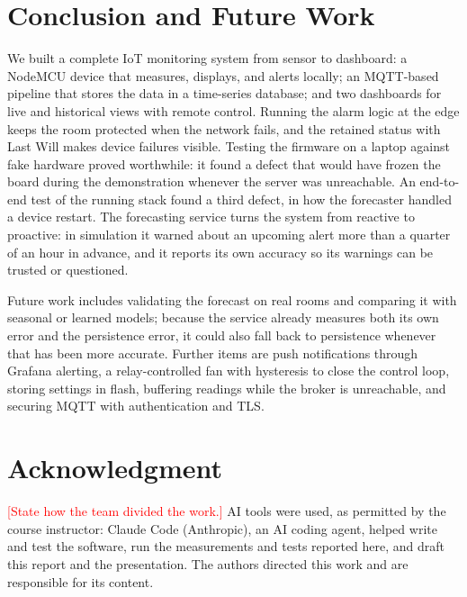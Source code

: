 \documentclass[conference]{IEEEtran}
\newcommand{\fillin}[1]{\textcolor{red}{[#1]}}
\begin{document}
\section{Conclusion and Future Work}

We built a complete IoT monitoring system from sensor to dashboard: a NodeMCU device
that measures, displays, and alerts locally; an MQTT-based pipeline that stores the
data in a time-series database; and two dashboards for live and historical views with
remote control. Running the alarm logic at the edge keeps the room protected when the
network fails, and the retained status with Last Will makes device failures visible.
Testing the firmware on a laptop against fake hardware proved worthwhile: it found
a defect that would have frozen the board during the demonstration whenever the server
was unreachable. An end-to-end test of the running stack found a third defect, in how
the forecaster handled a device restart. The forecasting service turns the system from reactive to proactive: in
simulation it warned about an upcoming alert more than a quarter of an hour in advance,
and it reports its own accuracy so its warnings can be trusted or questioned.

Future work includes validating the forecast on real rooms and comparing it with
seasonal or learned models; because the service already measures both its own error and the
persistence error, it could also fall back to persistence whenever that has been more
accurate. Further items are push notifications through Grafana alerting, a relay-controlled fan with
hysteresis to close the control loop, storing settings in flash, buffering readings while
the broker is unreachable, and securing MQTT with authentication and TLS.

\section*{Acknowledgment}
\fillin{State how the team divided the work.} AI tools were used, as permitted by the course
instructor: Claude Code (Anthropic), an AI coding agent, helped write and test the software,
run the measurements and tests reported here, and draft this report and the presentation.
The authors directed this work and are responsible for its content.
\end{document}

